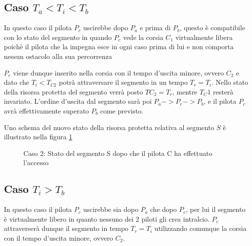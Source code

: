 \documentclass[a4paper,11pt, twoside]{book}
\begin{document}
      \subsection{Caso $T_a < T_i < T_b$}
	In questo caso il pilota $P_c$ uscirebbe dopo $P_a$ e prima di $P_b$, questo è compatibile con 
	lo stato del segmento in quando $P_c$ vede la corsia $C_1$ virtualmente libera poichè
	il pilota che la impegna esce in ogni caso prima di lui e non comporta nessun ostacolo alla sua percorrenza
	
	$P_c$ viene dunque inserito nella corsia con il tempo d'uscita minore, ovvero $C_2$ e dato che
	$T_i < T_{C2}$ potrà attraversare il segmento in un tempo $T_r = T_i$. 
	Nello stato della risorsa protetta del segmento verrà posto $TC_2 = T_r$, mentre $T_C1$ resterà invariato.
	L'ordine d'uscita dal segmento sarà poi $P_a -> P_c -> P_b$, e il pilota $P_c$ avrà effettivamente 
	superato $P_b$ come previsto.
	
	Uno schema del nuovo stato della risorsa protetta relativa al segmento $S$ è illustrato nella figura 
	\ref{fgr:AccessoSegmentiCaso2}

	\begin{figure}[h]
	  \centering
	  \caption{Caso 2: Stato del segmento S dopo che il pilota C ha effettuato l'accesso}
	  \label{fgr:AccessoSegmentiCaso2}
	\end{figure}
      
      \subsection{Caso $T_i > T_b$}
	In questo caso il pilota $P_c$ uscirebbe sia dopo $P_a$ che dopo $P_c$, per lui il segmento
	è virtualmente libero in quanto nessuno dei 2 piloti gli crea intralcio. $P_c$ attraverserà
	dunque il segmento in tempo $T_r = T_i$ utilizzando comunque la corsia con il tempo d'uscita minore,
	ovvero $C_2$.
	
\end{document}

